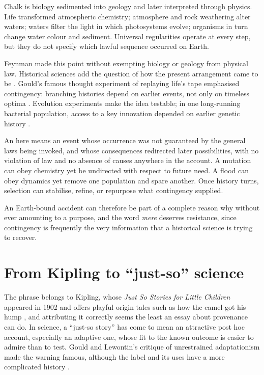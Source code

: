 Chalk is biology sedimented into geology and later interpreted through physics. Life transformed atmospheric chemistry; atmosphere and rock weathering alter waters; waters filter the light in which photosystems evolve; organisms in turn change water colour and sediment. Universal regularities operate at every step, but they do not specify which lawful sequence occurred on Earth.

Feynman made this point without exempting biology or geology from physical law. Historical sciences add the question of how the present arrangement came to be \citep{feynman1963}. Gould's famous thought experiment of replaying life's tape emphasised contingency: branching histories depend on earlier events, not only on timeless optima \citep{gould1989}. Evolution experiments make the idea testable; in one long-running bacterial population, access to a key innovation depended on earlier genetic history \citep{blount2008}.

An  here means an event whose occurrence was not guaranteed by the general laws being invoked, and whose consequences redirected later possibilities, with no violation of law and no absence of causes anywhere in the account. A mutation can obey chemistry yet be undirected with respect to future need. A flood can obey dynamics yet remove one population and spare another. Once history turns, selection can stabilise, refine, or repurpose what contingency supplied.

An Earth-bound accident can therefore be part of a complete reason why without ever amounting to a purpose, and the word \emph{mere} deserves resistance, since contingency is frequently the very information that a historical science is trying to recover.

\section{From Kipling to ``just-so'' science}

The phrase belongs to Kipling, whose \emph{Just So Stories for Little Children} appeared in 1902 and offers playful origin tales such as how the camel got his hump \citep{kipling1902}, and attributing it correctly seems the least an essay about provenance can do. In science, a ``just-so story'' has come to mean an attractive post hoc account, especially an adaptive one, whose fit to the known outcome is easier to admire than to test. Gould and Lewontin's critique of unrestrained adaptationism made the warning famous, although the label and its uses have a more complicated history \citep{gouldlewontin1979,hubalek2020}.

